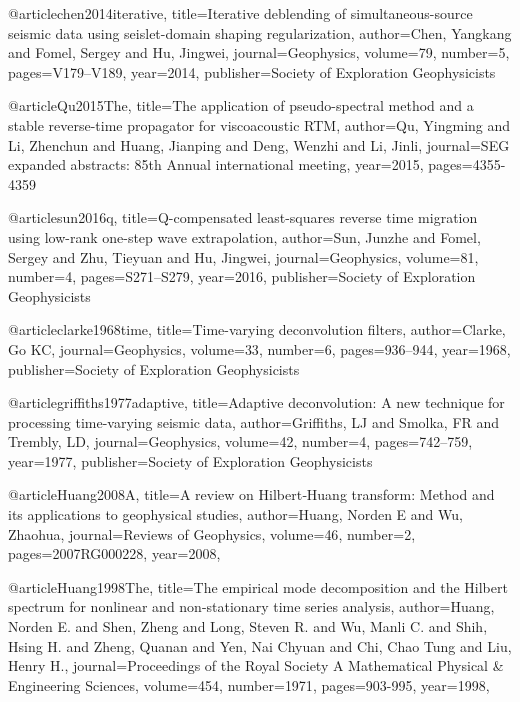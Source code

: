 {@article{chen2014iterative,
  title={Iterative deblending of simultaneous-source seismic data using seislet-domain shaping regularization},
  author={Chen, Yangkang and Fomel, Sergey and Hu, Jingwei},
  journal={Geophysics},
  volume={79},
  number={5},
  pages={V179--V189},
  year={2014},
  publisher={Society of Exploration Geophysicists}
}

@article{Qu2015The,
  title={The application of pseudo-spectral method and a stable reverse-time propagator for viscoacoustic {RTM}},
  author={Qu, Yingming and Li, Zhenchun and Huang, Jianping and Deng, Wenzhi and Li, Jinli},
  journal={SEG expanded abstracts: 85th Annual international meeting},
  year={2015},
  pages={4355-4359}
}

@article{sun2016q,
  title={Q-compensated least-squares reverse time migration using low-rank one-step wave extrapolation},
  author={Sun, Junzhe and Fomel, Sergey and Zhu, Tieyuan and Hu, Jingwei},
  journal={Geophysics},
  volume={81},
  number={4},
  pages={S271--S279},
  year={2016},
  publisher={Society of Exploration Geophysicists}
}

@article{clarke1968time,
  title={Time-varying deconvolution filters},
  author={Clarke, Go KC},
  journal={Geophysics},
  volume={33},
  number={6},
  pages={936--944},
  year={1968},
  publisher={Society of Exploration Geophysicists}
}

@article{griffiths1977adaptive,
  title={Adaptive deconvolution: A new technique for processing time-varying seismic data},
  author={Griffiths, LJ and Smolka, FR and Trembly, LD},
  journal={Geophysics},
  volume={42},
  number={4},
  pages={742--759},
  year={1977},
  publisher={Society of Exploration Geophysicists}
}

@article{Huang2008A,
  title={A review on {H}ilbert‐{H}uang transform: {M}ethod and its applications to geophysical studies},
  author={Huang, Norden E and Wu, Zhaohua},
  journal={Reviews of Geophysics},
  volume={46},
  number={2},
  pages={2007RG000228},
  year={2008},
}

@article{Huang1998The,
  title={The empirical mode decomposition and the Hilbert spectrum for nonlinear and non-stationary time series analysis},
  author={Huang, Norden E. and Shen, Zheng and Long, Steven R. and Wu, Manli C. and Shih, Hsing H. and Zheng, Quanan and Yen, Nai Chyuan and Chi, Chao Tung and Liu, Henry H.},
  journal={Proceedings of the Royal Society A Mathematical Physical \& Engineering Sciences},
  volume={454},
  number={1971},
  pages={903-995},
  year={1998},
}


}
